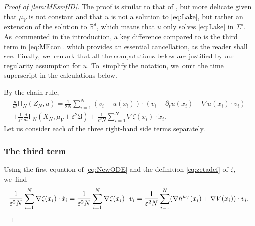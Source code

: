 \documentclass[JEP,XML,SOM,Unicode,published]{cedram}
\newcommand{\Sigmacirc}{\Sigma^\circ}
\theoremstyle{plain}
\theoremstyle{definition}
\DeclarePairedDelimiter{\pa}{\lparen}{\rparen}
\newcommand{\R}{{\mathbb{R}}}
\let\vep\varepsilon
\let\p\partial
\let\ux X
\let\uz Z
\newcommand{\Uu}{\mathfrak{U}}
\newcommand{\Fr}{\mathsf{F}}
\newcommand{\Hr}{\mathsf{H}}
\renewcommand{\d}{\mathsf{d}}
\begin{document}
\begin{proof}[Proof of \cref{lem:MEsmfID}]
The proof is similar to that of \cite[Eq.\,(2.7)]{HkI2021}, but more delicate given that $\mu_V$ is not constant and that $u$ is not a solution to \eqref{eq:Lake}, but rather an extension of the solution to $\R^\d$, which means that $u$ only solves \eqref{eq:Lake} in $\Sigmacirc$. As~commented in the introduction, a key difference compared to \cite{HkI2021} is the third term in \eqref{eq:MEcon}, which provides an essential cancellation, as the reader shall see. Finally, we~remark that all the computations below are justified by our regularity assumption for $u$. To~simplify the notation, we~omit the time superscript in the calculations below.

By the chain rule,\vspace*{-5pt}\enlargethispage{\baselineskip}
\begin{multline}\label{eq:dtHNstart}
\frac{d}{dt}\Hr_{N}(\uz_N,u) = \frac{1}{2N}\sum_{i=1}^N (v_i-u(x_i)) \cdot (\dot{v}_i - \p_t u(x_i) - \nabla u(x_i)\cdot v_i) \\[-8pt]
+ \frac{1}{\vep^2}\frac{d}{dt}\Fr_N(\ux_N,\mu_V+\vep^2\Uu) + \frac{1}{\vep^2N}\sum_{i=1}^N \nabla\zeta(x_i)\cdot \dot{x}_i.
\end{multline}
Let us consider each of the three right-hand side terms separately.

\subsubsection*{The third term} Using the first equation of \eqref{eq:NewODE} and the definition \eqref{eq:zetadef} of $\zeta$, we~find\vspace*{-5pt}
\begin{equation}\label{eq:dtVcon}
\frac{1}{\vep^2 N}\sum_{i=1}^N \nabla\zeta(x_i)\cdot \dot{x}_i = \frac{1}{\vep^2 N}\sum_{i=1}^N\nabla \zeta(x_i)\cdot v_i = \frac{1}{\vep^2 N}\sum_{i=1}^N\pa*{\nabla h^{\mu_V}(x_i) + \nabla V(x_i)}\cdot v_i.
\end{equation}


\end{proof}
\end{document}
